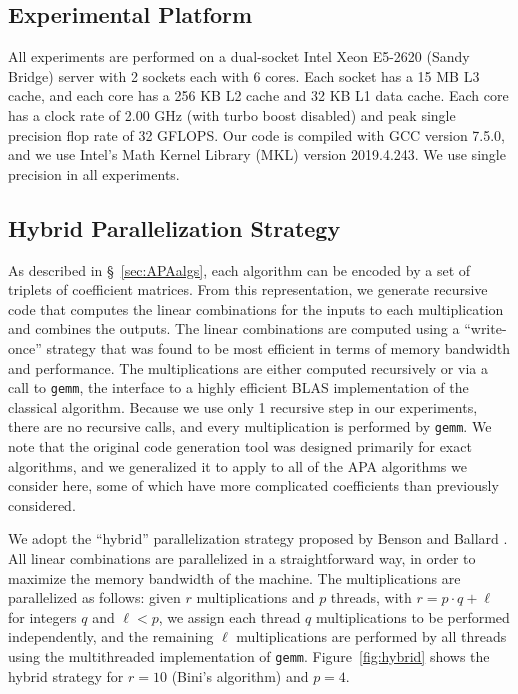 \documentclass[manuscript]{acmart}
\begin{document}
\subsection{Experimental Platform}

All experiments are performed on a dual-socket Intel Xeon E5-2620 (Sandy Bridge) server with 2 sockets each with 6 cores. 
Each socket has a 15 MB L3 cache, and each core has a 256 KB L2 cache and 32 KB L1 data cache. 
Each core has a clock rate of 2.00 GHz (with turbo boost disabled) and peak single precision flop rate of 32 GFLOPS. 
Our code is compiled with GCC version 7.5.0, 
and we use Intel's Math Kernel Library (MKL) version 2019.4.243.
We use single precision in all experiments.

\subsection{Hybrid Parallelization Strategy}

As described in \S~\ref{sec:APAalgs}, each algorithm can be encoded by a set of triplets of coefficient matrices.
From this representation, we generate recursive code that computes the linear combinations for the inputs to each multiplication and combines the outputs.
The linear combinations are computed using a ``write-once'' strategy that was found to be most efficient in terms of memory bandwidth and performance.
The multiplications are either computed recursively or via a call to \texttt{gemm}, the interface to a highly efficient BLAS implementation of the classical algorithm.
Because we use only 1 recursive step in our experiments, there are no recursive calls, and every multiplication is performed by \texttt{gemm}.
We note that the original code generation tool was designed primarily for exact algorithms, and we generalized it to apply to all of the APA algorithms we consider here, some of which have more complicated coefficients than previously considered.

We adopt the ``hybrid'' parallelization strategy proposed by Benson and Ballard \cite{BB15}.
All linear combinations are parallelized in a straightforward way, in order to maximize the memory bandwidth of the machine.
The multiplications are parallelized as follows: given $r$ multiplications and $p$ threads, with $r=p\cdot q + \ell$ for integers $q$ and $\ell<p$, we assign each thread $q$ multiplications to be performed independently, and the remaining $\ell$ multiplications are performed by all threads using the multithreaded implementation of \texttt{gemm}.
Figure~\ref{fig:hybrid} shows the hybrid strategy for $r=10$ (Bini's algorithm) and $p=4$.
\end{document}
